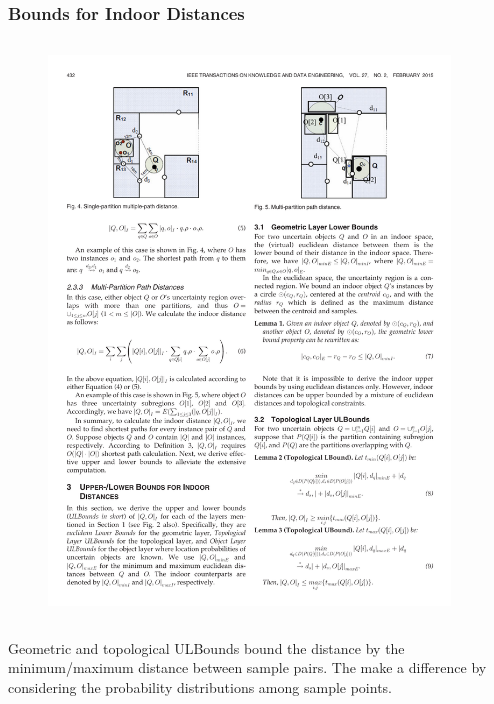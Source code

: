 
\begin{frame}
\frametitle{Bounds for Indoor Distances}

\begin{columns}[c]

  \begin{figure}[tb]
    \includegraphics[width=\columnwidth]{figures/2-7/2-7-3.pdf}
  \end{figure}

  \begin{example}
  \end{example}

\end{columns}

\vspace{15pt}

\textrm{Geometric and topological ULBounds bound the distance by the minimum/maximum distance between sample pairs. The  make a difference by considering the probability distributions among sample points.}

\end{frame}
